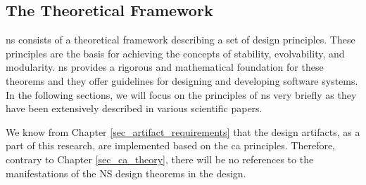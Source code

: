 \subsection{The Theoretical Framework} \label{subsec_ns_desing_theorems}

\gls{ns} consists of a theoretical framework describing a set of design principles. These
principles are the basis for achieving the concepts of stability, evolvability, and
modularity. \gls{ns} provides a rigorous and mathematical foundation for these theorems
and they offer guidelines for designing and developing software systems. In the following
sections, we will focus on the principles of \gls{ns} very briefly as they have been
extensively described in various scientific papers.

We know from Chapter \ref{sec_artifact_requirements} that the design artifacts, as a part
of this research, are implemented based on the \gls{ca} principles. Therefore, contrary to
Chapter \ref{sec_ca_theory}, there will be no references to the manifestations of the NS
design theorems in the design.